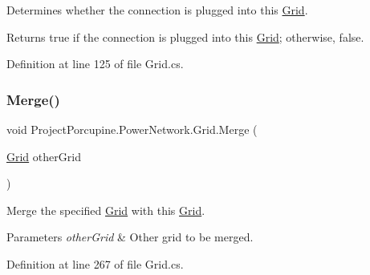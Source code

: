 Determines whether the connection is plugged into this \hyperlink{class_project_porcupine_1_1_power_network_1_1_grid}{Grid}. 

\begin{DoxyReturn}{Returns}
{\ttfamily true} if the connection is plugged into this \hyperlink{class_project_porcupine_1_1_power_network_1_1_grid}{Grid}; otherwise, {\ttfamily false}.
\end{DoxyReturn}


Definition at line 125 of file Grid.\+cs.

\mbox{\label{class_project_porcupine_1_1_power_network_1_1_grid_ae148d4d22d825dfe0365788bcba03c6c}} 
\subsubsection{\texorpdfstring{Merge()}{Merge()}}
{\footnotesize\ttfamily void Project\+Porcupine.\+Power\+Network.\+Grid.\+Merge (\begin{DoxyParamCaption}\item[{\hyperlink{class_project_porcupine_1_1_power_network_1_1_grid}{Grid}}]{other\+Grid }\end{DoxyParamCaption})}



Merge the specified \hyperlink{class_project_porcupine_1_1_power_network_1_1_grid}{Grid} with this \hyperlink{class_project_porcupine_1_1_power_network_1_1_grid}{Grid}. 


\begin{DoxyParams}{Parameters}
{\em other\+Grid} & Other grid to be merged.\\
\hline
\end{DoxyParams}


Definition at line 267 of file Grid.\+cs.

\mbox{\label{class_project_porcupine_1_1_power_network_1_1_grid_a4848e6cc4ac8aceb3e1ff92ff5a01179}} 
